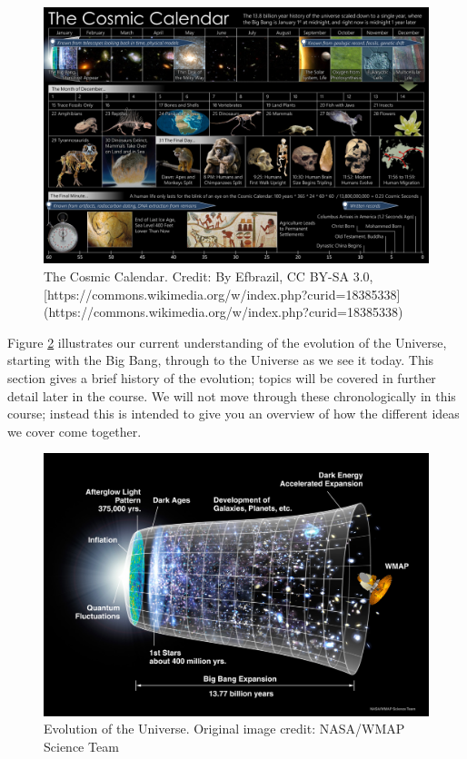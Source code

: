 \documentclass[]{book}
\begin{document}
\begin{figure}
\includegraphics[width=1\linewidth]{Images/CosmicCalendar} \caption{The Cosmic Calendar. Credit: By Efbrazil, CC BY-SA 3.0, [https://commons.wikimedia.org/w/index.php?curid=18385338](https://commons.wikimedia.org/w/index.php?curid=18385338)}\label{fig:cosmic-calendar}
\end{figure}

Figure \ref{fig:evo-universe} illustrates our current understanding of
the evolution of the Universe, starting with the Big Bang, through to
the Universe as we see it today. This section gives a brief history of
the evolution; topics will be covered in further detail later in the
course. We will not move through these chronologically in this course;
instead this is intended to give you an overview of how the different
ideas we cover come together.

\begin{figure}
\includegraphics[width=1\linewidth]{Images/060915_CMB_Timeline150_annotated} \caption{Evolution of the Universe. Original image credit: NASA/WMAP Science Team}\label{fig:evo-universe}
\end{figure}
\end{document}
